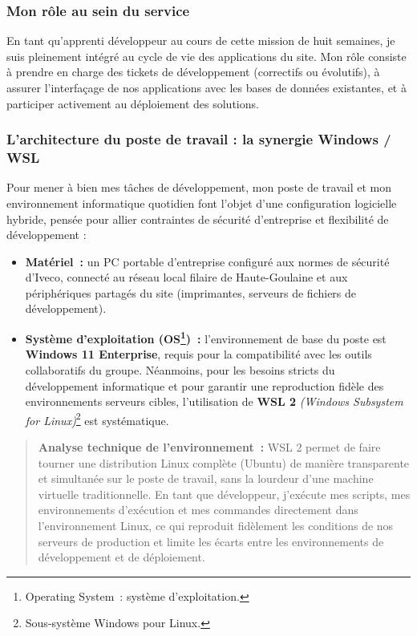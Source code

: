 \subsubsection*{Mon rôle au sein du service}

En tant qu'apprenti développeur au cours de cette mission de huit semaines, je suis pleinement intégré au cycle de vie des applications du site. Mon rôle consiste à prendre en charge des tickets de développement (correctifs ou évolutifs), à assurer l'interfaçage de nos applications avec les bases de données existantes, et à participer activement au déploiement des solutions.

\subsubsection*{L'architecture du poste de travail : la synergie Windows / WSL}

Pour mener à bien mes tâches de développement, mon poste de travail et mon environnement informatique quotidien font l'objet d'une configuration logicielle hybride, pensée pour allier contraintes de sécurité d'entreprise et flexibilité de développement :

\begin{itemize}
    \item \textbf{Matériel~:} un PC portable d'entreprise configuré aux normes de sécurité d'Iveco, connecté au réseau local filaire de Haute-Goulaine et aux périphériques partagés du site (imprimantes, serveurs de fichiers de développement).
    \item \textbf{Système d'exploitation (OS\footnote{Operating System~: système d'exploitation.})~:} l'environnement de base du poste est \textbf{Windows 11 Enterprise}, requis pour la compatibilité avec les outils collaboratifs du groupe. Néanmoins, pour les besoins stricts du développement informatique et pour garantir une reproduction fidèle des environnements serveurs cibles, l'utilisation de \textbf{WSL 2} \textit{(Windows Subsystem for Linux)}\footnote{Sous-système Windows pour Linux.} est systématique.
\end{itemize}

\begin{quote}
\textbf{Analyse technique de l'environnement~:} WSL 2 permet de faire tourner une distribution Linux complète (Ubuntu) de manière transparente et simultanée sur le poste de travail, sans la lourdeur d'une machine virtuelle traditionnelle. En tant que développeur, j'exécute mes scripts, mes environnements d'exécution et mes commandes directement dans l'environnement Linux, ce qui reproduit fidèlement les conditions de nos serveurs de production et limite les écarts entre les environnements de développement et de déploiement.
\end{quote}

